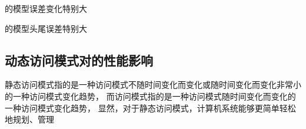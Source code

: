 
{\li}的模型误差变化特别大

{\li}的模型头尾误差特别大

\subsection{动态访问模式对{\li}的性能影响}

静态访问模式指的是一种访问模式不随时间变化而变化或随时间变化而变化非常小的一种访问模式变化趋势，
而访问模式指的是一种访问模式随时间变化而变化的一种访问模式变化趋势，
显然，对于静态访问模式，计算机系统能够更简单轻松地规划、管理

